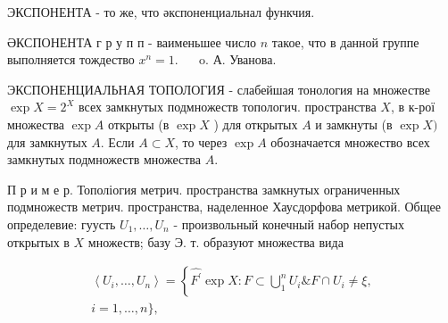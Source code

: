 \documentclass[10pt]{article}
\begin{document}
ЭКСПОНЕНТА - то же, что әкспоненциальнал функчия.



ӘКСПОНЕНТА г р у п п - ваименьшее число $n$ такое, что в данной группе выполняется тождество $x^{n}=1$. $\quad$ o. А. Уванова.



ЭКСПОНЕНЦИАЛЬНАЯ ТОПОЛОГИЯ - слабейшая тонология на множестве $\exp X=2^{X}$ всех замкнутых подмножеств топологич. пространства $X$, в к-рої множества $\exp A$ открыты (в $\exp X$ ) для открытых $A$ и замкнуты (в $\exp X)$ для замкнутых $A$. Если $A \subset X$, то через $\exp A$ обозначается множество всех замкнутых подмножеств множества $A$.



П р и м е р. Тополіогия метрич. пространства замкнутых ограниченных подмножеств метрич. пространства, наделенное Хаусдорфова метрикой. Общее определевие: гуусть $U_{1}, \ldots, U_{n}$ - произвольный конечный набор непустых открытых в $X$ множеств; базу Э. т. образуют множества вида



\[

\begin{gathered}

\left\langle U_{i}, \ldots, U_{n}\right\rangle=\left\{\hat{F^{\prime}} \exp X: F \subset \bigcup_{1}^{n} U_{i} \& F \cap U_{i} \neq \xi,\right. \\

i=1, \ldots, n\},

\end{gathered}

\]
\end{document}
